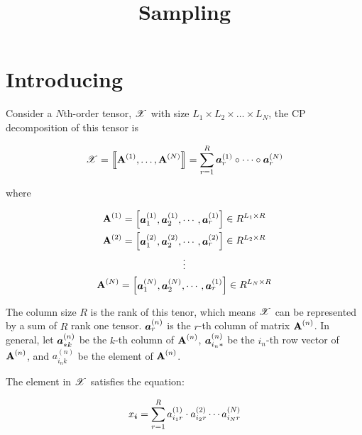 \documentclass{article}
\newcommand{\Sca}[3]{{#1}^{(#2)}_{i_#2#3}}%
\newcommand{\T}[1]{\boldsymbol{\mathscr{\MakeUppercase{#1}}}}%
\newcommand{\V}[1]{{\bm{{\MakeLowercase{#1}}}}}%
\newcommand{\VnC}[3]{\V{#1}^{(#2)}_{#3}}%
\newcommand{\Varow}[1]{\V{a}^{(#1)}_{i_#1*}}
\newcommand{\Vacol}[1]{\V{a}^{(#1)}_{*k}}
\newcommand{\M}[1]{{\bm{\mathbf{\MakeUppercase{#1}}}}}%
\newcommand{\Mn}[2]{\M{#1}^{(#2)}}%
\newcommand{\KT}[1]{\left\llbracket #1 \right\rrbracket}
\begin{document}
\title{Sampling}
\date{}
\author{}
\maketitle



\section{Introducing}
Consider a $N$th-order tensor, $\T{X}$ with size $L_1\times L_2\times\ldots\times L_N$, the CP decomposition of this tensor is

\begin{equation}\label{eq:CPDecomposition}
\T{X}= \KT{ \Mn{A}{1},\dots,\Mn{A}{N}} =
\sum_{r=1}^{R}\VnC{A}{1}{r} \circ \cdots \circ \VnC{A}{N}{r}
\end{equation}

where

\begin{gather*}\label{eq:ColumnVectorsForm}
\M{A}^{(1)} =
\begin{bmatrix}\VnC{a}{1}{1},\VnC{a}{1}{2},\cdots,\VnC{a}{1}{r}\end{bmatrix}\in R^{L_1\times R}\\
\M{A}^{(2)} =
\begin{bmatrix}\VnC{a}{2}{1},\VnC{a}{2}{2},\cdots,\VnC{a}{2}{r}\end{bmatrix}\in R^{L_2\times R}\\
\vdots\\
\M{A}^{(N)} =
\begin{bmatrix}\VnC{a}{N}{1},\VnC{a}{N}{2},\cdots,\VnC{a}{1}{r}\end{bmatrix}\in R^{L_N\times R}\\
\end{gather*}

The column size $R$ is the rank of this tenor, which means $\T{X}$ can be represented by a sum of $R$ rank one tensor. $\VnC{a}{n}{r}$ is the $r$-th column of matrix $\Mn{A}{n}$.
In general, let $\Vacol{n}$ be the $k$-th column of $\M{A}^{(n)}$, $\Varow{n}$ be the $i_n$-th row vector of $\M{A}^{(n)}$, and $\Sca{a}{n}{k}$ be the element of $\M{A}^{(n)}$.

The element in $\T{X}$ satisfies the equation:

\begin{equation}\label{eq:ValueInTensor}
x_\V{i} = \sum_{r=1}^{R}\Sca{a}{1}{r}\cdot\Sca{a}{2}{r}\cdots\Sca{a}{N}{r}
\end{equation}
\end{document}
